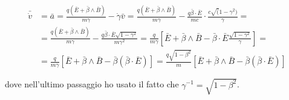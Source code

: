 \begin{equation}
\begin{split}
\bar{\dot v}& = \bar a = \frac{q(\bar E + \bar \beta \wedge \bar B)}{m \gamma} - \dot \gamma \bar v =
\frac{q(\bar E + \bar \beta \wedge \bar B)}{m \gamma} - \frac{q \bar \beta \cdot \bar E}{mc} 
\cdot \frac{c \sqrt(1-\gamma^2)}{\gamma} = \\
& = \frac{q(\bar E + \bar \beta \wedge \bar B)}{m \gamma} -
\frac{q\bar \beta \cdot \bar E \sqrt{1-\gamma^2}}{m\gamma^2} =
\frac{q}{m\gamma}[\bar E + \bar \beta \wedge \bar B - \bar \beta \cdot \bar E \frac{\sqrt{1-\gamma^2}}{\gamma}]=\\
& = \frac{q}{m\gamma}[\bar E + \bar \beta \wedge \bar B - \bar \beta (\bar \beta \cdot \bar E)] =  
\frac{q \sqrt{1-\beta^2}}{m}[\bar E + \bar \beta \wedge \bar B - \bar \beta (\bar \beta \cdot \bar E)] 
\end{split}
\end{equation}

dove nell'ultimo passaggio ho usato il fatto che $\gamma^{-1} = \sqrt{1-\beta^2}$.

